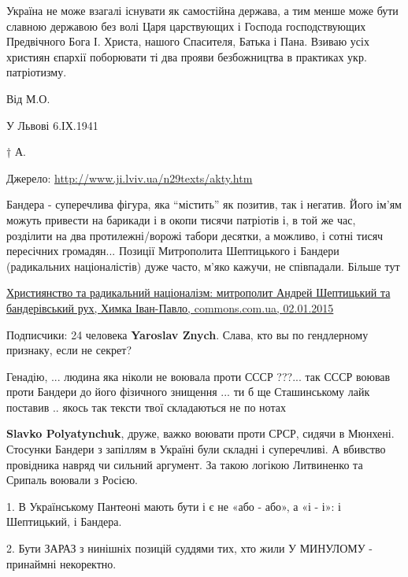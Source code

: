 \begin{itemize}
Україна не може взагалі існувати як самостійна держава, а тим менше може бути
славною державою без волі Царя царствующих і Господа господствующих Предвічного
Бога І. Христа, нашого Спасителя, Батька і Пана. Взиваю усіх християн єпархії
поборювати ті два прояви безбожництва в практиках укр. патріотизму.

Від М.О.

У Львові 6.ІХ.1941

† А.

Джерело: \url{http://www.ji.lviv.ua/n29texts/akty.htm}


Бандера - суперечлива фігура, яка \enquote{містить} як позитив, так і негатив. Його
ім'ям можуть привести на барикади і в окопи тисячи патріотів і, в той же час,
розділити на два протилежні/ворожі табори десятки, а можливо, і сотні тисяч
пересічних громадян... Позиції Митрополита Шептицького і Бандери (радикальних
націоналістів) дуже часто, м'яко кажучи, не співпадали. Більше тут

\href{https://commons.com.ua/uk/andrej-sheptitskij-ta-banderivskij-ruh}{%
Християнство та радикальний націоналізм: митрополит Андрей Шептицький та бандерівський рух, %
Химка Іван-Павло, commons.com.ua, 02.01.2015%
}

\begin{itemize} %
Подписчики: 24 человека \textbf{Yaroslav Znych}. Слава, кто вы по гендлерному признаку, если не секрет?
\end{itemize} %


Генадію, ... людина яка ніколи не воювала проти СССР ???... так СССР воював
проти Бандери до його фізичного знищення ...  ти б ще Сташинському лайк
поставив .. якось так тексти твої складаються не по нотах

\begin{itemize} %
\textbf{Slavko Polyatynchuk}, друже, важко воювати проти СРСР, сидячи в Мюнхені. Стосунки Бандери з запіллям в Україні були складні і суперечливі. А вбивство провідника навряд чи сильний аргумент. За такою логікою Литвиненко та Срипаль воювали з Росією.
\end{itemize} %


1. В Українському Пантеоні мають бути і є не «або - або», а «і - і»: і
Шептицький, і Бандера.

2. Бути ЗАРАЗ з нинішніх позицій суддями тих, хто жили У МИНУЛОМУ - принаймні
некоректно.


\end{itemize}
